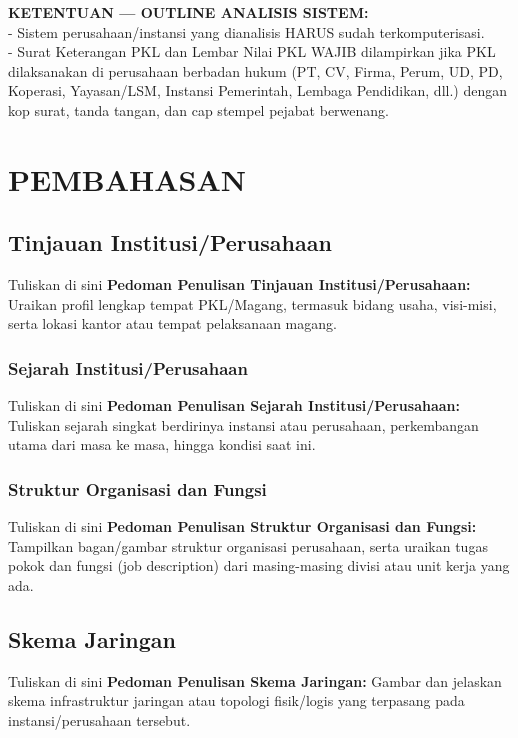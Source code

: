 \noindent\textbf{KETENTUAN — OUTLINE ANALISIS SISTEM:} \\
- Sistem perusahaan/instansi yang dianalisis HARUS sudah terkomputerisasi. \\
- Surat Keterangan PKL dan Lembar Nilai PKL WAJIB dilampirkan jika PKL dilaksanakan di perusahaan berbadan hukum (PT, CV, Firma, Perum, UD, PD, Koperasi, Yayasan/LSM, Instansi Pemerintah, Lembaga Pendidikan, dll.) dengan kop surat, tanda tangan, dan cap stempel pejabat berwenang.

\vspace{0.5cm}
\chapter{PEMBAHASAN}
\section{Tinjauan Institusi/Perusahaan}


Tuliskan di sini \textbf{Pedoman Penulisan Tinjauan Institusi/Perusahaan:} Uraikan profil lengkap tempat PKL/Magang, termasuk bidang usaha, visi-misi, serta lokasi kantor atau tempat pelaksanaan magang.


\subsection{Sejarah Institusi/Perusahaan}


Tuliskan di sini \textbf{Pedoman Penulisan Sejarah Institusi/Perusahaan:} Tuliskan sejarah singkat berdirinya instansi atau perusahaan, perkembangan utama dari masa ke masa, hingga kondisi saat ini.


\subsection{Struktur Organisasi dan Fungsi}


Tuliskan di sini \textbf{Pedoman Penulisan Struktur Organisasi dan Fungsi:} Tampilkan bagan/gambar struktur organisasi perusahaan, serta uraikan tugas pokok dan fungsi (job description) dari masing-masing divisi atau unit kerja yang ada.


\section{Skema Jaringan}


Tuliskan di sini \textbf{Pedoman Penulisan Skema Jaringan:} Gambar dan jelaskan skema infrastruktur jaringan atau topologi fisik/logis yang terpasang pada instansi/perusahaan tersebut.


